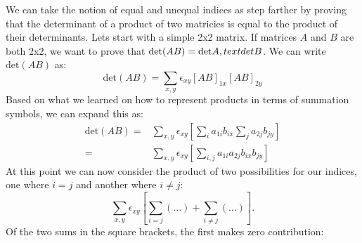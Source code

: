We can take the notion of equal and unequal indices as step farther by proving that the determinant of a product of two matricies is equal to the product of their determinants.  Lets start with a simple 2x2 matrix.  If matrices $A$ and $B$ are both 2x2, we want to prove that $\text{det}(AB)=\text{det}A\\,text{det}B$.  We can write $\text{det}(AB)$ as:
\[
\text{det}(AB)= \sum_{x,y} \epsilon_{xy} [AB]_{1x} [AB]_{2y}
\]
Based on what we learned on how to represent products in terms of summation symbols, we can expand this as:
\begin{align*}
\text{det}(AB)=& \sum_{x,y} \epsilon_{xy} \left[ \sum_i a_{1i}b_{ix} \sum_j a_{2j}b_{jy}\right]\\
=&  \sum_{x,y} \epsilon_{xy} \left[ \sum_{i,j}  a_{1i}a_{2j} b_{ix}b_{jy}\right]
\end{align*}
At this point we can now consider the product of two possibilities for our indices, one where $i=j$ and another where $i \neq j$:
\[
 \sum_{x,y} \epsilon_{xy} \left[ \sum_{i=j}(\ldots)+\sum_{i \neq j} (\ldots) \right].
\]
Of the two sums in the square brackets, the first makes zero contribution:

